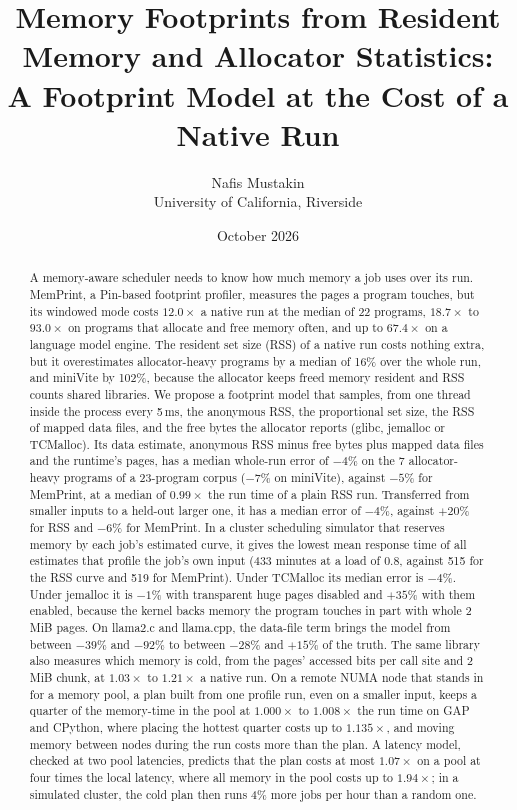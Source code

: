 \documentclass[11pt]{article}
\title{Memory Footprints from Resident Memory and Allocator Statistics:\\
A Footprint Model at the Cost of a Native Run}
\author{Nafis Mustakin\\University of California, Riverside}
\date{October 2026}
\newcommand{\memprint}{MemPrint}
\begin{document}
\setlength{\emergencystretch}{3em}
\maketitle

\begin{abstract}
A memory-aware scheduler needs to know how much memory a job uses over its run. \memprint{}, a Pin-based
footprint profiler, measures the pages a program touches, but its windowed mode costs $12.0\times$ a native run at
the median of 22 programs, $18.7\times$ to $93.0\times$ on programs that allocate and free memory often, and up to
$67.4\times$ on a language model engine. The resident set size (RSS) of a native run costs nothing extra, but it
overestimates allocator-heavy programs by a median of 16\% over the whole run, and miniVite by 102\%, because the
allocator keeps freed memory resident and RSS counts shared libraries. We propose a footprint model that samples, from
one thread inside the process every 5\,ms, the anonymous RSS, the proportional set size, the RSS of mapped data files,
and the free bytes the allocator reports (glibc, jemalloc or TCMalloc). Its data estimate, anonymous RSS minus free
bytes plus mapped data files and the runtime's pages, has a median whole-run error of $-4\%$ on the 7 allocator-heavy
programs of a 23-program corpus ($-7\%$ on miniVite), against $-5\%$ for \memprint{}, at a median of $0.99\times$ the
run time of a plain RSS run. Transferred from smaller inputs to a held-out larger one, it has a median error of
$-4\%$, against $+20\%$ for RSS and $-6\%$ for \memprint{}. In a cluster scheduling simulator that reserves memory by
each job's estimated curve, it gives the lowest mean response time of all estimates that profile the job's own input
(433 minutes at a load of 0.8, against 515 for the RSS curve and 519 for \memprint{}). Under TCMalloc its median
error is $-4\%$. Under jemalloc it is $-1\%$ with transparent huge pages disabled and $+35\%$ with them enabled,
because the kernel backs memory the program touches in part with whole 2\,MiB pages. On llama2.c and llama.cpp, the
data-file term brings the model from between $-39\%$ and $-92\%$ to between $-28\%$ and $+15\%$ of the truth.
The same library also measures which memory is cold, from the pages' accessed bits per call site and 2\,MiB chunk, at
$1.03\times$ to $1.21\times$ a native run. On a remote NUMA node that stands in for a memory pool, a plan built from
one profile run, even on a smaller input, keeps a quarter of the memory-time in the pool at $1.000\times$ to
$1.008\times$ the run time on GAP and CPython, where placing the hottest quarter costs up to $1.135\times$, and
moving memory between nodes during the run costs more than the plan. A latency model, checked at two pool latencies,
predicts that the plan costs at most $1.07\times$ on a pool at four times the local latency, where all memory in the
pool costs up to $1.94\times$; in a simulated cluster, the cold plan then runs 4\% more jobs per hour than a random
one.
\end{abstract}
\end{document}
